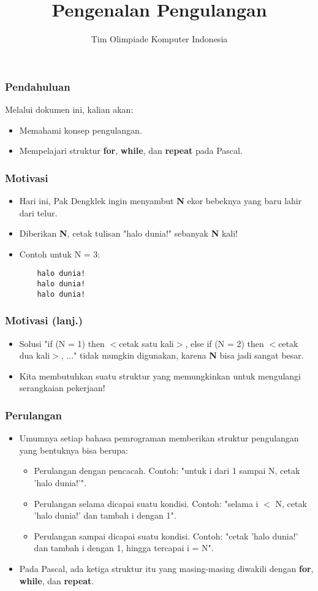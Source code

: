 \documentclass{beamer}
\title{Pengenalan Pengulangan}
\author{Tim Olimpiade Komputer Indonesia}
\begin{document}
\begin{frame}
\titlepage
\end{frame}

\begin{frame}
\frametitle{Pendahuluan}
Melalui dokumen ini, kalian akan:
\begin{itemize}
	\item Memahami konsep pengulangan.
	\item Mempelajari struktur \textbf{for}, \textbf{while}, dan \textbf{repeat} pada Pascal.
\end{itemize}
\end{frame}

\begin{frame}[fragile]
\frametitle{Motivasi}
\begin{itemize}
	\item Hari ini, Pak Dengklek ingin menyambut \textbf{N} ekor bebeknya yang baru lahir dari telur.
	\item Diberikan \textbf{N}, cetak tulisan "halo dunia!" sebanyak \textbf{N} kali!
	\item Contoh untuk N = 3:
	\begin{lstlisting}
	halo dunia!
	halo dunia!
	halo dunia!
	\end{lstlisting}
\end{itemize}
\end{frame}

\begin{frame}
\frametitle{Motivasi (lanj.)}
\begin{itemize}
	\item Solusi "if (N = 1) then $<$cetak satu kali$>$, else if (N = 2) then $<$cetak dua kali$>$, ..." tidak mungkin digunakan, karena \textbf{N} bisa jadi sangat besar.
	\item Kita membutuhkan suatu struktur yang memungkinkan untuk mengulangi serangkaian pekerjaan!
\end{itemize}
\end{frame}

\begin{frame}
\frametitle{Perulangan}
\begin{itemize}
	\item Umumnya setiap bahasa pemrograman memberikan struktur pengulangan yang bentuknya bisa berupa:
	\begin{itemize}
		\item Perulangan dengan pencacah. Contoh: "untuk i dari 1 sampai N, cetak 'halo dunia!'".
		\item Perulangan selama dicapai suatu kondisi. Contoh: "selama i $<$ N, cetak 'halo dunia!' dan tambah i dengan 1".
		\item Perulangan sampai dicapai suatu kondisi. Contoh: "cetak 'halo dunia!' dan tambah i dengan 1, hingga tercapai i = N".
	\end{itemize}
	\item Pada Pascal, ada ketiga struktur itu yang masing-masing diwakili dengan \alert{\textbf{for}}, \alert{\textbf{while}}, dan \alert{\textbf{repeat}}. 
\end{itemize}
\end{frame}
\end{document}
